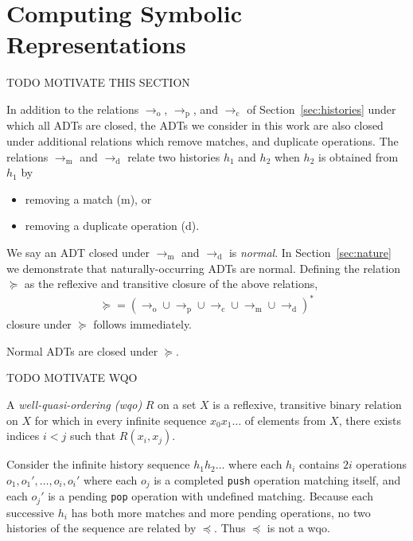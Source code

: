 \section{Computing Symbolic Representations}
\label{sec:algorithm}

TODO MOTIVATE THIS SECTION

In addition to the relations $\to_\mathrm{o}$, $\to_\mathrm{p}$, and
$\to_\mathrm{c}$ of Section~\ref{sec:histories} under which all ADTs are
closed, the ADTs we consider in this work are also closed under additional
relations which remove matches, and duplicate operations. The relations
$\to_\mathrm{m}$ and $\to_\mathrm{d}$ relate two histories $h_1$ and $h_2$ when
$h_2$ is obtained from $h_1$ by
\begin{itemize}

  \item removing a match (m), or

  \item removing a duplicate operation (d).

\end{itemize}
We say an ADT closed under $\to_\mathrm{m}$ and $\to_\mathrm{d}$ is
\emph{normal}. In Section~\ref{sec:nature} we demonstrate that
naturally-occurring ADTs are normal. Defining the relation $\succeq$ as the
reflexive and transitive closure of the above relations,
\begin{align*}
  \succeq = (\to_\mathrm{o} \cup \to_\mathrm{p} \cup \to_\mathrm{c} \cup 
  \to_\mathrm{m} \cup \to_\mathrm{d})^\ast
\end{align*}
closure under $\succeq$ follows immediately.

\begin{lemma}

  Normal ADTs are closed under $\succeq$.

\end{lemma}

TODO MOTIVATE WQO

A \emph{well-quasi-ordering (wqo)} $R$ on a set $X$ is a reflexive, transitive
binary relation on $X$ for which in every infinite sequence $x_0 x_1 \ldots$ of
elements from $X$, there exists indices $i < j$ such that $R(x_i,x_j)$.

\begin{example}

  Consider the infinite history sequence $h_1 h_2 \ldots$ where each $h_i$
  contains $2i$ operations $o_1, o_1', \ldots, o_i, o_i'$ where each $o_j$ is a
  completed {\tt push} operation matching itself, and each $o_j'$ is a pending
  {\tt pop} operation with undefined matching. Because each successive $h_i$
  has both more matches and more pending operations, no two histories of the
  sequence are related by $\preceq$. Thus $\preceq$ is not a wqo.

\end{example}

